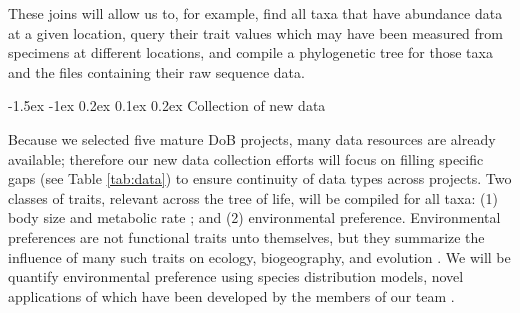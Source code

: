 \documentclass[11pt]{article}
\makeatletter
\renewcommand\subsubsection{\@startsection{subsection}{1}{\z@}%
                                  {-1.5ex \@plus -1ex \@minus 0.2ex}%
                                  {0.1ex \@plus 0.2ex}%
                                  {\normalfont\bfseries}}
\makeatother
\begin{document}
These joins will allow us to, for example, find all taxa that have
abundance data at a given location, query their trait values which may
have been measured from specimens at different locations, and compile
a phylogenetic tree for those taxa and the files containing their raw
sequence data.

\subsubsection{Collection of new data} \label{collection-of-new-data}

Because we selected five mature DoB projects, many data resources are
already available; therefore our new data collection efforts will
focus on filling specific gaps (see Table \ref{tab:data}) to ensure
continuity of data types across projects. Two classes of traits,
relevant across the tree of life, will be compiled for all taxa: (1)
body size and metabolic rate \cite{brown2004, price2012}; and (2)
environmental preference. Environmental preferences are not functional
traits unto themselves, but they summarize the influence of many such
traits on ecology, biogeography, and evolution \cite{elith2009}. We
will be quantify environmental preference using species distribution
models, novel applications of which have been developed by the
members of our team \citep[e.g.;][]{Owens2017-ja, Carnaval2014-je,
  Carnaval2008-og}.
\end{document}

